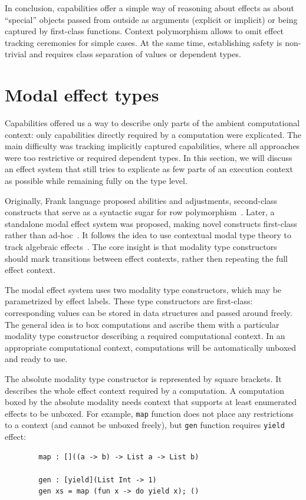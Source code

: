 \documentclass[conference]{IEEEtran}
\begin{document}
    In conclusion, capabilities offer a simple way of reasoning about effects as about ``special'' objects passed from outside as arguments (explicit or implicit) or being captured by first-class functions.
    Context polymorphism allows to omit effect tracking ceremonies for simple cases.
    At the same time, establishing safety is non-trivial and requires class separation of values or dependent types.


    \section{Modal effect types} \label{sec:modal}

    Capabilities offered us a way to describe only parts of the ambient computational context: only capabilities directly required by a computation were explicated.
    The main difficulty was tracking implicitly captured capabilities, where all approaches were too restrictive or required dependent types.
    In this section, we will discuss an effect system that still tries to explicate as few parts of an execution context as possible while remaining fully on the type level.

    Originally, Frank language proposed abilities and adjustments, second-class constructs that serve as a syntactic sugar for row polymorphism~\cite{lindley2017do, convent2020doo}.
    Later, a standalone modal effect system was proposed, making novel constructs first-class rather than ad-hoc~\cite{tang2025modal}.
    It follows the idea to use contextual modal type theory to track algebraic effects~\cite{zyuzin2021contextual}.
    The core insight is that modality type constructors should mark transitions between effect contexts, rather then repeating the full effect context.

    The modal effect system uses two modality type constructors, which may be parametrized by effect labels.
    These type constructors are first-class: corresponding values can be stored in data structures and passed around freely.
    The general idea is to box computations and ascribe them with a particular modality type constructor describing a required computational context.
    In an appropriate computational context, computations will be automatically unboxed and ready to use.

    The absolute modality type constructor is represented by square brackets.
    It describes the whole effect context required by a computation.
    A computation boxed by the absolute modality needs context that supports at least enumerated effects to be unboxed.
    For example, \texttt{map} function does not place any restrictions to a context (and cannot be unboxed freely), but \texttt{gen} function requires \texttt{yield} effect:
    \begin{verbatim}
        map : []((a -> b) -> List a -> List b)

        gen : [yield](List Int -> 1)
        gen xs = map (fun x -> do yield x); ()
    \end{verbatim}
\end{document}
